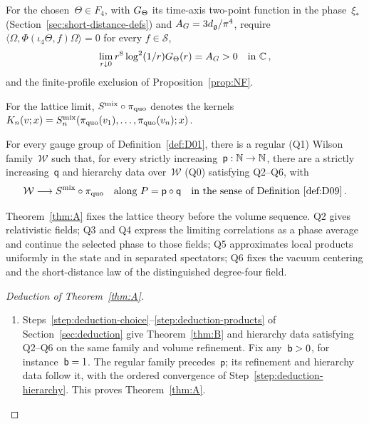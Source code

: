 \begin{definition}\label{def:Q6}
For the chosen~$\Theta\in F_4$, with $G_{\Theta}$ its time-axis two-point function in the phase~$\xi_*$ (Section~\ref{sec:short-distance-defs}) and $A_G=3d_{\mathfrak{g}}/\pi^4$, require $\langle\Omega,\Phi(\iota_4\Theta,f)\Omega\rangle=0$ for every $f\in\mathcal S$,
\begin{equation*}
\lim_{r\downarrow0}r^8\log^2(1/r)G_{\Theta}(r)=A_G>0
\quad\text{in }\mathbb{C}\,,
\end{equation*}
and the finite-profile exclusion of Proposition~\ref{prop:NF}.
\end{definition}

For the lattice limit, $S^{\rm mix}\circ\pi_{\rm quo}$ denotes the kernels $K_n(v;x)=S_n^{\rm mix}(\pi_{\rm quo}(v_1),\ldots,\pi_{\rm quo}(v_n);x)$.

\setcounter{maintheorem}{0}
\begin{maintheorem}[Existence]\label{thm:A}
For every gauge group of Definition~\ref{def:D01}, there is a regular \textup{(Q1)} Wilson family~$\mathcal W$ such that, for every strictly increasing~$\mathsf p:\mathbb{N}\to\mathbb{N}$, there are a strictly increasing~$\mathsf q$ and hierarchy data over~$\mathcal W$ \textup{(Q0)} satisfying \textup{Q2--Q6}, with
\begin{equation*}
\mathcal W\longrightarrow S^{\rm mix}\circ\pi_{\rm quo}
\quad\text{along }P=\mathsf p\circ\mathsf q
\quad\text{in the sense of Definition~\ref{def:D09}}\,.
\end{equation*}
\end{maintheorem}

Theorem~\ref{thm:A} fixes the lattice theory before the volume sequence. Q2 gives relativistic fields; Q3 and Q4 express the limiting correlations as a phase average and continue the selected phase to those fields; Q5 approximates local products uniformly in the state and in separated spectators; Q6 fixes the vacuum centering and the short-distance law of the distinguished degree-four field.

\begin{proof}[Deduction of Theorem~\ref{thm:A}]
\begin{enumerate}[label=\textup{\arabic*.},ref=\arabic*,start=10]
\item\label{step:deduction-conclusion} Steps~\ref{step:deduction-choice}--\ref{step:deduction-products} of Section~\ref{sec:deduction} give Theorem~\ref{thm:B} and hierarchy data satisfying Q2--Q6 on the same family and volume refinement. Fix any~$\mathsf{b}>0$, for instance~$\mathsf{b}=1$. The regular family precedes~$\mathsf p$; its refinement and hierarchy data follow it, with the ordered convergence of Step~\ref{step:deduction-hierarchy}. This proves Theorem~\ref{thm:A}.\qedhere
\end{enumerate}
\end{proof}

